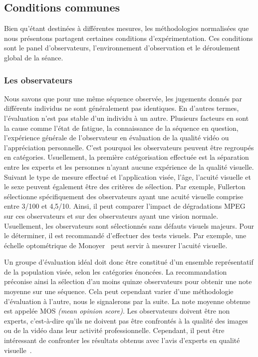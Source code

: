 \subsection{Conditions communes}
Bien qu'étant destinées à différentes mesures, les méthodologies normalisées que nous présentons partagent certaines conditions d'expérimentation. Ces conditions sont le panel d'observateurs, l'environnement d'observation et le déroulement global de la séance.


\subsubsection{Les observateurs}
Nous savons que pour une même séquence observée, les jugements donnés par différents individus ne sont généralement pas identiques. En d'autres termes, l'évaluation n'est pas stable d'un individu à un autre. Plusieurs facteurs en sont la cause comme l'état de fatigue, la connaissance de la séquence en question, l'expérience générale de l'observateur en évaluation de la qualité vidéo ou l'appréciation personnelle. C'est pourquoi les observateurs peuvent être regroupés en catégories. Usuellement, la première catégorisation effectuée est la séparation entre les experts et les personnes n'ayant aucune expérience de la qualité visuelle. Suivant le type de mesure effectué et l'application visée, l'âge, l'acuité visuelle et le sexe peuvent également être des critères de sélection. Par exemple, Fullerton~\cite{fullerton-josa2007} sélectionne spécifiquement des observateurs ayant une acuité visuelle comprise entre 3/100 et 4,5/10. Ainsi, il peut comparer l'impact de dégradations MPEG sur ces observateurs et sur des observateurs ayant une vision normale. Usuellement, les observateurs sont sélectionnés sans défauts visuels majeurs. Pour le déterminer, il est recommandé d'effectuer des tests visuels. Par exemple, une échelle optométrique de Monoyer~\cite{monoyer-plates} peut servir à mesurer l'acuité visuelle.

Un groupe d'évaluation idéal doit donc être constitué d'un ensemble représentatif de la population visée, selon les catégories énoncées. La recommandation \ituCC{} préconise ainsi la sélection d'au moins quinze observateurs pour obtenir une note moyenne sur une séquence. Cela peut cependant varier d'une méthodologie d'évaluation à l'autre, nous le signalerons par la suite. La note moyenne obtenue est appelée MOS \emph{(mean opinion score)}. Les observateurs doivent être non experts, c'est-à-dire qu'ils ne doivent pas être confrontés à la qualité des images ou de la vidéo dans leur activité professionnelle. Cependant, il peut être intéressant de confronter les résultats obtenus avec l'avis d'experts en qualité visuelle~\cite{svt-assesstudy}.


